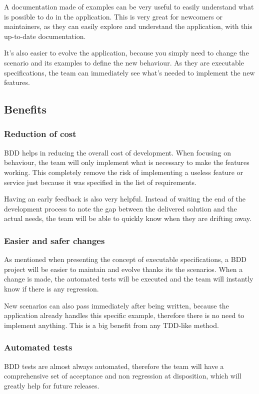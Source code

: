 A documentation made of examples can be very useful to easily understand
what is possible to do in the application.
This is very great for newcomers or maintainers, as they can easily explore
and understand the application, with this up-to-date documentation.

It's also easier to evolve the application, because you simply need to change
the scenario and its examples to define the new behaviour.
As they are executable specifications, the team can immediately see what's
needed to implement the new features.

\subsection{Benefits}\label{subsec:benefits}

\subsubsection{Reduction of cost}
BDD helps in reducing the overall cost of development.
When focusing on behaviour, the team will only implement what is necessary to
make the features working.
This completely remove the risk of implementing a useless feature or service
just because it was specified in the list of requirements.

Having an early feedback is also very helpful.
Instead of waiting the end of the development process to note the gap
between the delivered solution and the actual needs, the team will be able to
quickly know when they are drifting away.

\subsubsection{Easier and safer changes}
As mentioned when presenting the concept of executable specifications, a BDD
project will be easier to maintain and evolve thanks its the scenarios.
When a change is made, the automated tests will be executed and the team will
instantly know if there is any regression.

New scenarios can also pass immediately after being written, because the
application already handles this specific example, therefore there is no need
to implement anything.
This is a big benefit from any TDD-like method.

\subsubsection{Automated tests}
BDD tests are almost always automated, therefore the team will have a
comprehensive set of acceptance and non regression at disposition, which will
greatly help for future releases.


